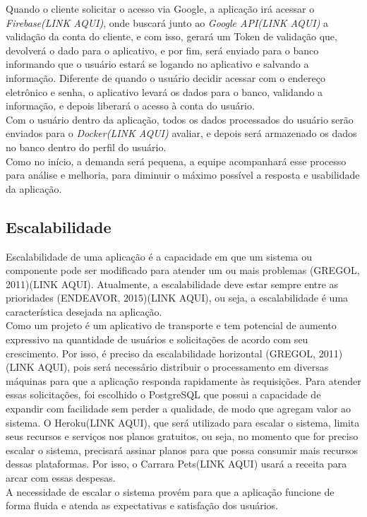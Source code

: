 Quando o cliente solicitar o acesso via Google, a aplicação irá acessar o \textit{Firebase(LINK AQUI)}, onde buscará junto ao \textit{Google API(LINK AQUI)} a validação da conta do cliente, e com isso, gerará um Token de validação que, devolverá o dado para o aplicativo, e por fim,  será enviado para o banco informando que o usuário estará se logando no aplicativo e salvando a informação. Diferente de quando o usuário decidir acessar com o endereço eletrônico e senha, o aplicativo levará os dados para o banco, validando a informação, e depois liberará  o acesso à conta do usuário.\\
Com o usuário dentro da aplicação, todos os dados processados do usuário serão enviados para o \textit{Docker(LINK AQUI)} avaliar, e depois será armazenado os dados no banco dentro do perfil do usuário.  \\
Como no início, a demanda será pequena, a equipe acompanhará esse processo para análise e melhoria, para diminuir o máximo possível a resposta e usabilidade da aplicação.\\

\subsection{Escalabilidade}
Escalabilidade de uma aplicação é a capacidade em que um sistema ou componente pode ser modificado para atender um ou mais problemas (GREGOL, 2011)(LINK AQUI). Atualmente, a escalabilidade deve estar sempre entre as prioridades (ENDEAVOR, 2015)(LINK AQUI), ou seja, a escalabilidade é uma característica desejada na aplicação.\\
Como um projeto é um aplicativo de transporte e tem potencial de aumento expressivo na quantidade de usuários e solicitações de acordo com seu crescimento. Por isso, é preciso da escalabilidade horizontal (GREGOL, 2011)(LINK AQUI), pois será necessário distribuir o processamento em diversas máquinas para que a aplicação responda rapidamente às requisições. Para atender essas solicitações, foi escolhido o PostgreSQL que possui a capacidade de expandir com facilidade sem perder a qualidade, de modo que agregam valor ao sistema. O Heroku(LINK AQUI), que será utilizado para escalar o sistema, limita seus recursos e serviços nos planos gratuitos, ou seja, no momento que for preciso escalar o sistema, precisará assinar planos para que possa consumir mais recursos dessas plataformas. Por isso, o Carrara Pets(LINK AQUI) usará a receita para arcar com essas despesas.\\
A necessidade de escalar o sistema provém para que a aplicação funcione de forma fluida e atenda as expectativas e satisfação dos usuários.

